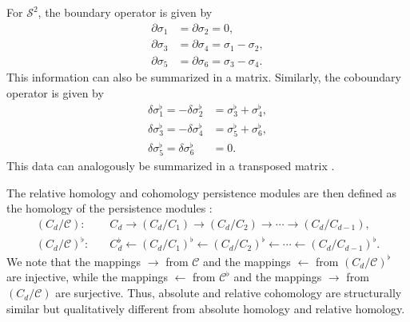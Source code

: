 \begin{example}
	For $\mathcal{S}^{2}$, the boundary operator is given by
	\begin{align}
		\partial\sigma_{1} & = \partial\sigma_{2} = 0,                       \\
		\partial\sigma_{3} & = \partial\sigma_{4} = \sigma_{1}-\sigma_{2},   \\
		\partial\sigma_{5} & = \partial\sigma_{6} = \sigma_{3} - \sigma_{4}.
	\end{align}
	This information can also be summarized in a matrix. Similarly, the coboundary
	operator is given by
	\begin{align}
		\delta\sigma_{1}^{\flat} = -\delta\sigma_{2}^{\flat} & = \sigma_{3}^{\flat} + \sigma_{4}^{\flat}, \\
		\delta\sigma_{3}^{\flat} = -\delta\sigma_{4}^{\flat} & = \sigma_{5}^{\flat} + \sigma_{6}^{\flat}, \\
		\delta\sigma_{5}^{\flat} = \delta\sigma_{6}^{\flat}  & = 0.
	\end{align}
	This data can analogously be summarized in a transposed matrix
	\cite[p.7]{de2011dualities}.

	The relative homology and cohomology persistence modules are then defined as
	the homology of the persistence modules \cite[p.7]{de2011dualities}:
	\begin{align}
		(C_{d}/\mathcal{C}):         & \quad C_{d} \rightarrow (C_{d}/C_{1}) \rightarrow (C_{d}/C_{2}) \rightarrow \cdots \rightarrow (C_{d}/C_{d-1}),                             \\
		(C_{d}/\mathcal{C})^{\flat}: & \quad C_{d}^{\flat} \leftarrow (C_{d}/C_{1})^{\flat} \leftarrow (C_{d}/C_{2})^{\flat} \leftarrow \cdots \leftarrow (C_{d}/C_{d-1})^{\flat}.
	\end{align}
	We note that the mappings $\rightarrow$ from $\mathcal{C}$ and the mappings $\leftarrow$
	from $(C_{d}/\mathcal{C})^{\flat}$ are injective, while the mappings
	$\leftarrow$ from $\mathcal{C}^{\flat}$ and the mappings $\rightarrow$ from
	$(C_{d}/\mathcal{C})$ are surjective. Thus, absolute and relative cohomology
	are structurally similar but qualitatively different from absolute homology
	and relative homology.
\end{example}


